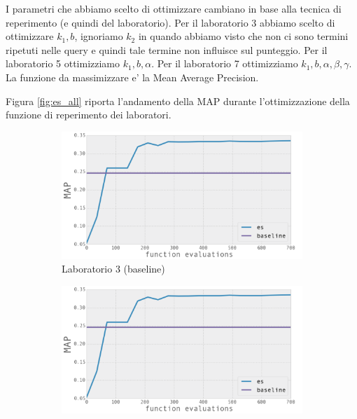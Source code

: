I parametri che abbiamo scelto di ottimizzare cambiano in base alla tecnica di reperimento (e quindi del laboratorio). Per il laboratorio 3 abbiamo scelto di ottimizzare $k_1, b$, ignoriamo $k_2$ in quando abbiamo visto che non ci sono termini ripetuti nelle query e quindi tale termine non influisce sul punteggio. Per il laboratorio 5 ottimizziamo $k_1, b, \alpha$. Per il laboratorio 7 ottimizziamo $k_1, b, \alpha, \beta, \gamma$. La funzione da massimizzare e' la Mean Average Precision.

Figura \ref{fig:es_all} riporta l'andamento della MAP durante l'ottimizzazione della funzione di reperimento dei laboratori. 
\begin{figure}
        \centering
        \begin{subfigure}[b]{0.475\textwidth}
            \centering
            \includegraphics[width=\textwidth]{figures/es_lab3.png}
            \caption[Network2]%
            {{\small Laboratorio 3 (baseline)}}    
            \label{fig:es_lab3}
        \end{subfigure}
        \hfill
        \begin{subfigure}[b]{0.475\textwidth}  
            \centering 
            \includegraphics[width=\textwidth]{figures/es_lab3.png}

\end{subfigure}
\end{figure}
